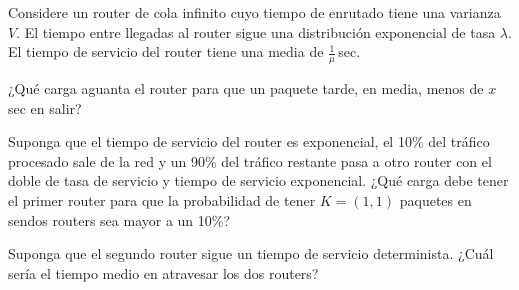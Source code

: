 \documentclass{upmassignment}
\date{\today}
\begin{document}
Considere un router de cola infinito cuyo tiempo de enrutado tiene
una varianza $V$. El tiempo entre llegadas al router sigue una
distribución exponencial de tasa $\lambda$.
El tiempo de servicio del router
tiene una media de $\tfrac{1}{\mu}$\,\textrm{sec}.


\begin{problemlist}
    \pbitem ¿Qué carga aguanta el router para que
    un paquete tarde, en media, menos de $x$\,\textrm{sec} en salir?

    \begin{solucion}
        
    \end{solucion}

    \pbitem Suponga que el tiempo
    de servicio del router es exponencial,
    el 10\% del tráfico
    procesado sale de la red y un 90\%
    del tráfico restante pasa a otro
    router con el doble de tasa de servicio
    y tiempo de servicio exponencial.
    ¿Qué carga debe tener el primer
    router para que la probabilidad
    de tener $K=(1,1)$ paquetes en sendos
    routers sea mayor a un 10\%?


    \begin{solucion}
        
    \end{solucion}

    \pbitem Suponga que el segundo router
    sigue un tiempo de servicio
    determinista.
    ¿Cuál sería el tiempo medio en
    atravesar los dos routers?

    \begin{solucion}
        
    \end{solucion}

\end{problemlist}
\end{document}

